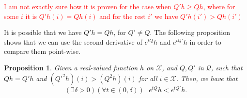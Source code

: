 \documentclass{article}
\newcommand{\statessymbol}{\mathcal{X}}
\newcommand{\matrices}{\mathcal{Q}}
\newcommand{\stateset}{\statessymbol}
\newcommand{\de}{\delta}
\newtheorem{Proposition}{Proposition}
\begin{document}
\textcolor{red}{I am not exactly sure how it is proven for the case when $Q'h\geq Qh$, where for some $i$ it is $Q'h(i)=Qh(i)$ and for the rest $i'$ we have $Q'h(i')>Qh(i')$}

It is possible that we have $Q'h=Qh$, for $Q'\neq Q$.
The following proposition shows that we can use the second derivative of $e^{tQ}h$ and $e^{tQ'}h$ in order to compare them point-wise.
\begin{Proposition} \label{prop:exp_2}
Given a real-valued function $h$ on $\stateset$, and $ Q, Q'$ in $\matrices$, such that $Q h=Q'h$ and $(Q'^{2}h)(i)>(Q^{2}h)(i)$ for all $i\in\stateset$.
Then, we have that
\begin{equation*}
(\exists\de>0)(\forall t\in(0,\de))\text{ }e^{t Q}h<e^{t Q'}h.
\end{equation*}
\end{Proposition}
\end{document}
